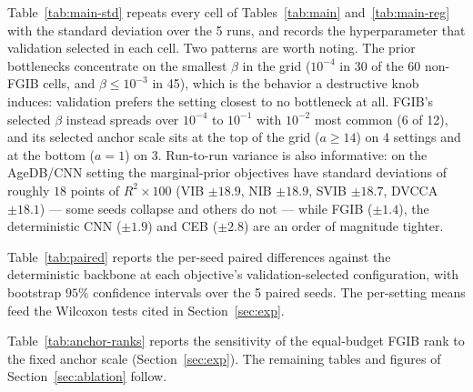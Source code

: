 \documentclass{article} %
\begin{document}
Table~\ref{tab:main-std} repeats every cell of Tables~\ref{tab:main}
and~\ref{tab:main-reg} with the standard
deviation over the 5 runs, and records the hyperparameter that validation selected in each
cell. Two patterns are worth noting. The prior bottlenecks concentrate on the smallest
$\beta$ in the grid ($10^{-4}$ in 30 of the 60 non-FGIB cells, and $\beta \le 10^{-3}$ in
45), which is the behavior a destructive knob induces: validation prefers the setting
closest to no bottleneck at all.
FGIB's selected $\beta$ instead spreads over $10^{-4}$ to $10^{-1}$ with $10^{-2}$ most
common (6 of 12), and its selected anchor scale sits at the top of the grid
($a \ge 14$) on 4 settings and at the bottom ($a=1$) on 3. Run-to-run variance is also
informative: on the AgeDB/CNN setting the marginal-prior objectives have standard
deviations of roughly $18$ points of $R^2\times100$ (VIB $\pm18.9$, NIB $\pm18.9$, SVIB
$\pm18.7$, DVCCA $\pm18.1$) --- some seeds collapse and others do not --- while FGIB
($\pm1.4$), the deterministic CNN ($\pm1.9$) and CEB ($\pm2.8$) are an order of magnitude
tighter.





Table~\ref{tab:paired} reports the per-seed paired differences against the deterministic
backbone at each objective's validation-selected configuration, with bootstrap $95\%$
confidence intervals over the 5 paired seeds. The per-setting means feed the Wilcoxon
tests cited in Section~\ref{sec:exp}.



Table~\ref{tab:anchor-ranks} reports the sensitivity of the equal-budget FGIB rank to
the fixed anchor scale (Section~\ref{sec:exp}). The remaining tables and figures of
Section~\ref{sec:ablation} follow.
















\end{document}

